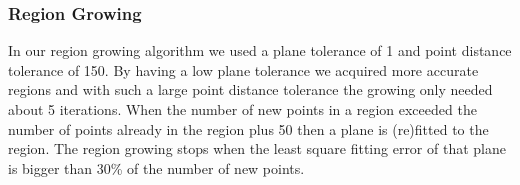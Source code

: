 \subsubsection{Region Growing}
In our region growing algorithm we used a plane tolerance of 1 and point distance tolerance of 150. By having a low plane tolerance we acquired more accurate regions and with such a large point distance tolerance the growing only needed about 5 iterations. When the number of new points in a region exceeded the number of points already in the region plus 50 then a plane is (re)fitted to the region. The region growing stops when the least square fitting error of that plane is bigger than 30\% of the number of new points.



